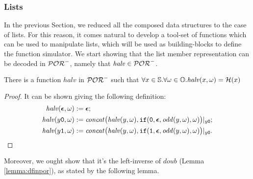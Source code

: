 \subsubsection{Lists}

In the previous Section,
we reduced all the composed data structures to the case of lists. For this
reason, it comes natural to develop a tool-set of functions which can be used
to manipulate lists, which will be used as building-blocks to define the
function simulator.
%
We start showing that the list member representation can
be decoded in $\mathcal{POR}^-$, namely that $\mathit{halv}\in \mathcal{POR}^-$.

\begin{lemma}
  There is a function $\mathit{halv}$ in $\mathcal{POR}^-$ such that
  $\forall x \in \mathbb{S}. \forall \omega \in \mathbb{O}. \mathit{halv}(x, \omega)=\mathcal H(x)$
\end{lemma}
\begin{proof}
  It can be shown giving the following definition:
  \begin{align*}
  \mathit{halv}(\bm{\epsilon},\omega) &:= \bm{\epsilon}; \\
  \mathit{halv}(y\mathtt{0}, \omega) &:= \mathit{concat}\big(\mathit{halv}(y,\omega),
  {\mathtt{if}}(\mathtt{0},\bm{\epsilon},
  \mathit{odd}(y,\omega),\omega)\big){|_{y\mathtt{0}}}; \\
  \mathit{halv}(y\mathtt{1},\omega) &:=
  \mathit{concat}\big(\mathit{halv}(y,\omega), {\mathtt{if}}
  (\mathtt{1},\bm{\epsilon},\mathit{odd}(y,\omega),\omega)\big)
  {|_{y\mathtt{0}}}.
  \end{align*}
\end{proof}
%
Moreover, we ought show that it's the left-inverse of $\mathit{doub}$ (Lemma \ref{lemma:dfinpor}), as stated by
the following lemma.

